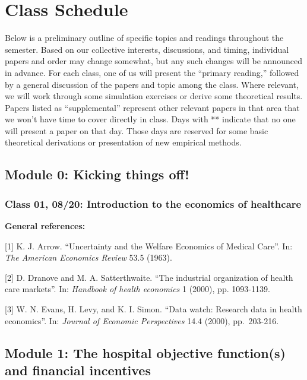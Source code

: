 \documentclass[11pt,]{article}
\begin{document}
\newpage

\hypertarget{class-schedule}{%
\section{Class Schedule}\label{class-schedule}}

Below is a preliminary outline of specific topics and readings
throughout the semester. Based on our collective interests, discussions,
and timing, individual papers and order may change somewhat, but any
such changes will be announced in advance. For each class, one of us
will present the ``primary reading,'' followed by a general discussion
of the papers and topic among the class. Where relevant, we will work
through some simulation exercises or derive some theoretical results.
Papers listed as ``supplemental'' represent other relevant papers in
that area that we won't have time to cover directly in class. Days with
** indicate that no one will present a paper on that day. Those days are
reserved for some basic theoretical derivations or presentation of new
empirical methods.

\hypertarget{module-0-kicking-things-off}{%
\subsection{Module 0: Kicking things
off!}\label{module-0-kicking-things-off}}

\hypertarget{class-01-0820-introduction-to-the-economics-of-healthcare}{%
\subsubsection{Class 01, 08/20: Introduction to the economics of
healthcare}\label{class-01-0820-introduction-to-the-economics-of-healthcare}}

\textbf{General references:}

{[}1{]} K. J. Arrow. ``Uncertainty and the Welfare Economics of Medical
Care''. In: \emph{The American Economics Review} 53.5 (1963).

{[}2{]} D. Dranove and M. A. Satterthwaite. ``The industrial
organization of health care markets''. In: \emph{Handbook of health
economics} 1 (2000), pp. 1093-1139.

{[}3{]} W. N. Evans, H. Levy, and K. I. Simon. ``Data watch: Research
data in health economics''. In: \emph{Journal of Economic Perspectives}
14.4 (2000), pp.~203-216.

\hypertarget{module-1-the-hospital-objective-functions-and-financial-incentives}{%
\subsection{Module 1: The hospital objective function(s) and financial
incentives}\label{module-1-the-hospital-objective-functions-and-financial-incentives}}
\end{document}
